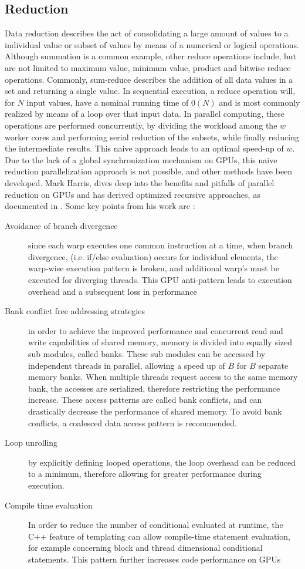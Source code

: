 \subsection{Reduction}
Data reduction describes the act of consolidating a large amount of values to
a individual value or subset of values by means of a numerical or logical operations.
Although summation is a common example, other reduce operations include,
but are not limited to maximum value, minimum value, product and bitwise reduce operations.
  Commonly,
sum-reduce describes the addition of all data values in a set and returning a single value.
In sequential execution, a reduce operation will, for $N$ input values, have a nominal
running time of $0(N)$ and is most commonly realized by means of a loop over that
input data.  In parallel computing, these operations are performed concurrently, by dividing the
workload among the $w$ worker cores and performing serial reduction of the subsets,
while finally reducing the intermediate results.  This naive approach leads to an
optimal \gls{speed-up} of $w$.  Due to the lack of a global synchronization mechanism
on \Glspl{GPU}, this naive reduction parallelization approach is not possible,
and other methods have been developed.  Mark Harris, dives deep into the benefits
and pitfalls of parallel reduction on \Glspl{GPU} and has derived optimized
recursive approaches, as documented in \cite{harris}.  Some key points from his work are
:
\begin{description}
  \item [Avoidance of branch divergence]
since each warp executes one common instruction at a time, when branch divergence,
(i.e. if/else evaluation) occurs for individual elements, the warp-wise execution pattern
is broken, and additional warp's must be executed for diverging threads. This \Gls{GPU} anti-pattern
leads to execution overhead and a subsequent loss in performance
  \item [Bank conflict free addressing strategies]
  in order to achieve the improved performance and concurrent read and write capabilities
  of shared memory, memory is divided into equally sized sub modules, called banks.
  These sub modules can be accessed by independent threads in parallel, allowing a speed up
  of $B$ for $B$ separate memory banks.  When multiple threads request access to
  the same memory bank, the accesses are serialized, therefore restricting the performance increase.
  These access patterns are called bank conflicts, and can drastically decrease
  the performance of shared memory.  To avoid bank conflicts, a coalesced data
  access pattern is recommended.
  \item [Loop unrolling] by explicitly defining looped operations, the loop overhead
  can be reduced to a minimum, therefore allowing for greater performance during execution.
  \item [Compile time evaluation]  In order to reduce the number of conditional
  evaluated at runtime, the C++ feature of templating can allow compile-time statement
  evaluation, for example concerning block and thread dimensional conditional statements.
  This pattern further increases code performance on \Glspl{GPU}
\end{description}

